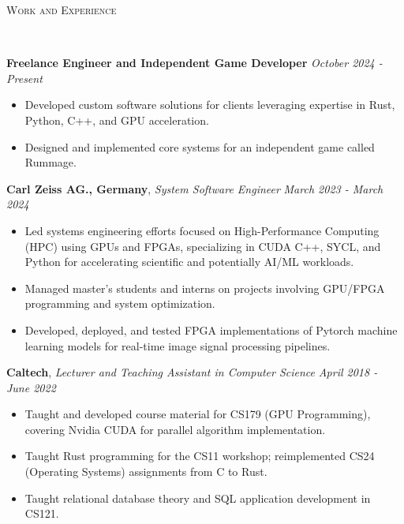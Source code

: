 \documentclass[8pt]{article}
\newenvironment{changemargin}[2]{%
  \begin{list}{}{%
    \setlength{\topsep}{0pt}%
    \setlength{\leftmargin}{#1}%
    \setlength{\rightmargin}{#2}%
    \setlength{\listparindent}{\parindent}%
    \setlength{\itemindent}{\parindent}%
    \setlength{\parsep}{0pt}%
    \setlength{\itemsep}{-2pt}%
  }%
  \item[]}{\end{list}
}
\newcommand{\lineover}{
	\begin{changemargin}{-0.05in}{-0.05in}
		\vspace*{-10pt}
		\hrulefill \\
		\vspace*{-4pt}
	\end{changemargin}
}
\newcommand{\header}[1]{
	\begin{changemargin}{-0.5in}{-0.5in}
		\scshape{#1}\\
  	\lineover
	\end{changemargin}
}
\newenvironment{body} {
	\vspace*{-10pt}
	\begin{changemargin}{-0.25in}{-0.5in}
  }	
	{\end{changemargin}
}
\begin{document}
\header{Work and Experience}
\begin{body}
	\vspace{10pt} %

	\textbf{Freelance Engineer and Independent Game Developer} \hfill \emph{October 2024 - Present}\\
	\vspace*{-6pt}
	\begin{itemize} \itemsep -2pt
		\item Developed custom software solutions for clients leveraging expertise in Rust, Python, C++, and GPU acceleration.
		\item Designed and implemented core systems for an independent game called
		Rummage. 
	\end{itemize}
	\vspace*{-6pt}

	\textbf{Carl Zeiss AG., Germany}, \emph{System Software Engineer} \hfill \emph{March 2023 - March 2024}\\
	\vspace*{-6pt} %
	\begin{itemize} \itemsep -2pt %
		\item Led systems engineering efforts focused on High-Performance Computing (HPC) using GPUs and FPGAs, specializing in CUDA C++, SYCL, and Python for accelerating scientific and potentially AI/ML workloads.
		\item Managed master's students and interns on projects involving GPU/FPGA programming and system optimization.
		\item Developed, deployed, and tested FPGA implementations of Pytorch machine learning models for real-time image signal processing pipelines.
	\end{itemize}
	\vspace*{-6pt}

	\textbf{Caltech}, \emph{Lecturer and Teaching Assistant in Computer Science} \hfill \emph{April 2018 - June 2022}\\
	\vspace*{-6pt}
	\begin{itemize} \itemsep -2pt
		\item Taught and developed course material for CS179 (GPU Programming), covering Nvidia CUDA for parallel algorithm implementation.
		\item Taught Rust programming for the CS11 workshop; reimplemented CS24 (Operating Systems) assignments from C to Rust.
		\item Taught relational database theory and SQL application development in CS121.
	\end{itemize}
	\vspace*{-6pt}


\end{body}
\end{document}
